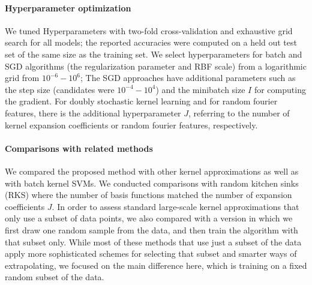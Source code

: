 \documentclass{article} %
\begin{document}
\paragraph{Hyperparameter optimization} We tuned Hyperparameters with two-fold cross-validation and exhaustive grid search for all models; the reported accuracies were computed on a held out test set of the same size as the training set. We select hyperparameters for batch and SGD algorithms (the regularization parameter and RBF scale) from a logarithmic grid from $10^{-6}-10^6$; The SGD approaches have additional parameters such as the step size (candidates were $10^{-4}-10^4$) and the minibatch size $I$ for computing the gradient. For doubly stochastic kernel learning and for random fourier features, there is the additional hyperparameter $J$, referring to the number of kernel expansion coefficients or random fourier features, respectively.

\paragraph{Comparisons with related methods}
We compared the proposed method with other kernel approximations as well as with batch kernel SVMs. We conducted comparisons with random kitchen sinks (RKS) where the number of basis functions matched the number of expansion coefficients $J$. In order to assess standard large-scale kernel approximations that only use a subset of data points, we also compared with a version in which we first draw one random sample from the data, and then train the algorithm with that subset only. While most of these methods that use just a subset of the data apply more sophisticated schemes for selecting that subset and smarter ways of extrapolating, we focused on the main difference here, which is training on a fixed random subset of the data. 
\end{document}
